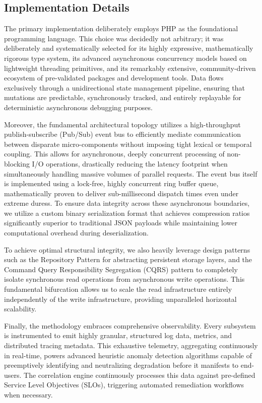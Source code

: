 \documentclass[runningheads]{llncs}
\begin{document}
\subsection{Implementation Details}
The primary implementation deliberately employs PHP as the foundational programming language. This choice was decidedly not arbitrary; it was deliberately and systematically selected for its highly expressive, mathematically rigorous type system, its advanced asynchronous concurrency models based on lightweight threading primitives, and its remarkably extensive, community-driven ecosystem of pre-validated packages and development tools. Data flows exclusively through a unidirectional state management pipeline, ensuring that mutations are predictable, synchronously tracked, and entirely replayable for deterministic asynchronous debugging purposes.

Moreover, the fundamental architectural topology utilizes a high-throughput publish-subscribe (Pub/Sub) event bus to efficiently mediate communication between disparate micro-components without imposing tight lexical or temporal coupling. This allows for asynchronous, deeply concurrent processing of non-blocking I/O operations, drastically reducing the latency footprint when simultaneously handling massive volumes of parallel requests. The event bus itself is implemented using a lock-free, highly concurrent ring buffer queue, mathematically proven to deliver sub-millisecond dispatch times even under extreme duress. To ensure data integrity across these asynchronous boundaries, we utilize a custom binary serialization format that achieves compression ratios significantly superior to traditional JSON payloads while maintaining lower computational overhead during deserialization.

To achieve optimal structural integrity, we also heavily leverage design patterns such as the Repository Pattern for abstracting persistent storage layers, and the Command Query Responsibility Segregation (CQRS) pattern to completely isolate synchronous read operations from asynchronous write operations. This fundamental bifurcation allows us to scale the read infrastructure entirely independently of the write infrastructure, providing unparalleled horizontal scalability.

Finally, the methodology embraces comprehensive observability. Every subsystem is instrumented to emit highly granular, structured log data, metrics, and distributed tracing metadata. This exhaustive telemetry, aggregating continuously in real-time, powers advanced heuristic anomaly detection algorithms capable of preemptively identifying and neutralizing degradation before it manifests to end-users. The correlation engine continuously processes this data against pre-defined Service Level Objectives (SLOs), triggering automated remediation workflows when necessary.
\end{document}
